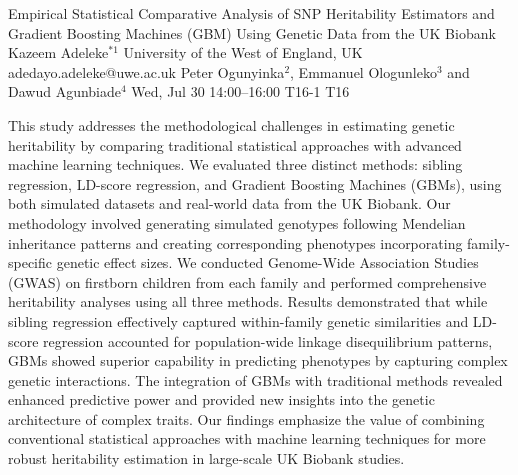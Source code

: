 \begin{talk}
  {Empirical Statistical Comparative Analysis of SNP Heritability Estimators and Gradient Boosting Machines (GBM) Using Genetic Data from the UK Biobank}%
  {Kazeem Adeleke$^{*1}$}%
  {University of the West of England, UK}%
  {adedayo.adeleke@uwe.ac.uk}%
  {Peter Ogunyinka$^{2}$, Emmanuel Ologunleko$^{3}$ and Dawud Agunbiade$^{4}$}%
  {}%
  {Wed, Jul 30 14:00–16:00}%
  {T16-1}%
  {T16}%
  
				
			
This study addresses the methodological challenges in estimating genetic heritability by comparing traditional statistical approaches with advanced machine learning techniques. We evaluated three distinct methods: sibling regression, LD-score regression, and Gradient Boosting Machines (GBMs), using both simulated datasets and real-world data from the UK Biobank. Our methodology involved generating simulated genotypes following Mendelian inheritance patterns and creating corresponding phenotypes incorporating family-specific genetic effect sizes. We conducted Genome-Wide Association Studies (GWAS) on firstborn children from each family and performed comprehensive heritability analyses using all three methods. Results demonstrated that while sibling regression effectively captured within-family genetic similarities and LD-score regression accounted for population-wide linkage disequilibrium patterns, GBMs showed superior capability in predicting phenotypes by capturing complex genetic interactions. The integration of GBMs with traditional methods revealed enhanced predictive power and provided new insights into the genetic architecture of complex traits. Our findings emphasize the value of combining conventional statistical approaches with machine learning techniques for more robust heritability estimation in large-scale UK Biobank studies.

\medskip


\end{talk}

